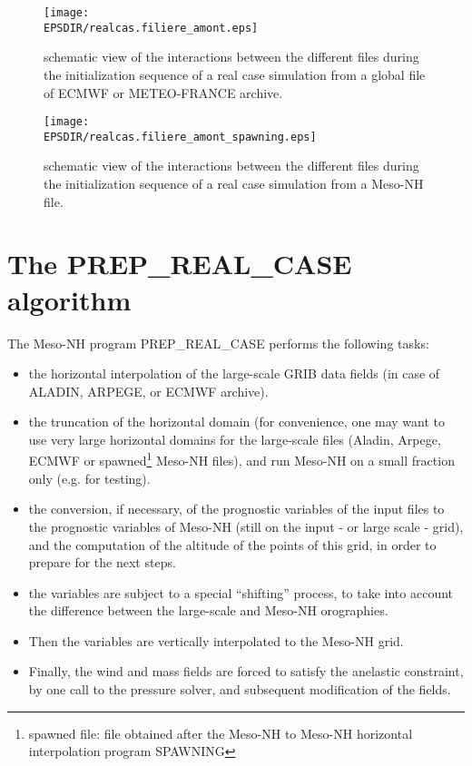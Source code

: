 \begin{figure}[!ht]
\centerline{\texttt{[image: \\EPSDIR/realcas.filiere\_amont.eps]}}
\caption{schematic view of the interactions between the different files
during the initialization sequence of a real case simulation from a global file
of ECMWF or METEO-FRANCE archive.
\label{schematicsequence}}
\end{figure}

\begin{figure}[!ht]
\centerline{\texttt{[image: \\EPSDIR/realcas.filiere\_amont\_spawning.eps]}}
\caption{schematic view of the interactions between the different files
during the initialization sequence of a real case simulation from a Meso-NH file.
\label{schematicsequence2}}
\end{figure}


\clearpage

\section{The PREP\_REAL\_CASE algorithm}

The Meso-NH program PREP\_REAL\_CASE performs the following tasks:
\begin{itemize}
\item the horizontal interpolation of the large-scale GRIB data fields
(in case of ALADIN, ARPEGE, or ECMWF archive).
\item the truncation of the horizontal domain (for convenience, one may want
to use very large horizontal domains for the large-scale files
(Aladin, Arpege, ECMWF or spawned\footnote{spawned file: file obtained after the
Meso-NH to Meso-NH horizontal interpolation program SPAWNING} Meso-NH files),
and run Meso-NH on a small fraction only (e.g. for testing).
\item the conversion, if necessary, of the prognostic variables of the input files to the
prognostic variables of Meso-NH (still on the input - or large scale - grid), and the
computation of the altitude of the points of this grid, in order to
prepare for the next steps.
\item the variables are subject to a special ``shifting'' process,
to take into account the difference between the large-scale and Meso-NH orographies.
\item Then the variables are vertically interpolated to the Meso-NH grid.
\item Finally, the wind and mass fields are forced to satisfy the
anelastic constraint, by one call to the pressure solver, and subsequent
modification of the fields.
\end{itemize}

